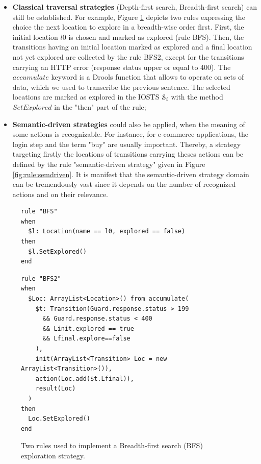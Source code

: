 \begin{itemize}
    \item \textbf{Classical traversal strategies} (Depth-first
        search, Breadth-first search) can still be established.
        For example, Figure \ref{fig:rule:bfs} depicts two rules
        expressing the choice the next location to explore in a
        breadth-wise order first. First, the initial location
        $l0$ is chosen and marked as explored (rule BFS).  Then,
        the transitions having an initial location marked as
        explored and a final location not yet explored are
        collected by the rule BFS2, except for the transitions
        carrying an HTTP error (response status upper or equal to
        400).  The $accumulate$ keyword is a Drools function that
        allows to operate on sets of data, which we used to
        transcribe the previous sentence.  The selected locations
        are marked as explored in the IOSTS $\EuScript{S}_i$ with
        the method $SetExplored$ in the "then" part of the rule;

    \item \textbf{Semantic-driven strategies} could also be
        applied, when the meaning of some actions is
        recognizable. For instance, for e-commerce applications,
        the login step and the term "buy" are usually important.
        Thereby, a strategy targeting firstly the locations of
        transitions carrying theses actions can be defined by the
        rule "semantic-driven strategy" given in Figure
        \ref{fig:rule:semdriven}.  It is manifest that the
        semantic-driven strategy domain can be tremendously vast
        since it depends on the number of recognized actions and
        on their relevance.
\end{itemize}

\begin{figure}[h]
\begin{framed}
\begin{BVerbatim}
rule "BFS"
when
  $l: Location(name == l0, explored == false)
then
  $l.SetExplored()
end
\end{BVerbatim}
\end{framed}

\begin{framed}
\begin{BVerbatim}
rule "BFS2"
when
  $Loc: ArrayList<Location>() from accumulate(
    $t: Transition(Guard.response.status > 199
      && Guard.response.status < 400
      && Linit.explored == true
      && Lfinal.explore==false
    ),
    init(ArrayList<Transition> Loc = new ArrayList<Transition>()),
    action(Loc.add($t.Lfinal)),
    result(Loc)
  )
then
  Loc.SetExplored()
end
\end{BVerbatim}
\end{framed}

\caption{Two rules used to implement a Breadth-first search (BFS)
exploration strategy.}
\label{fig:rule:bfs}
\end{figure}

